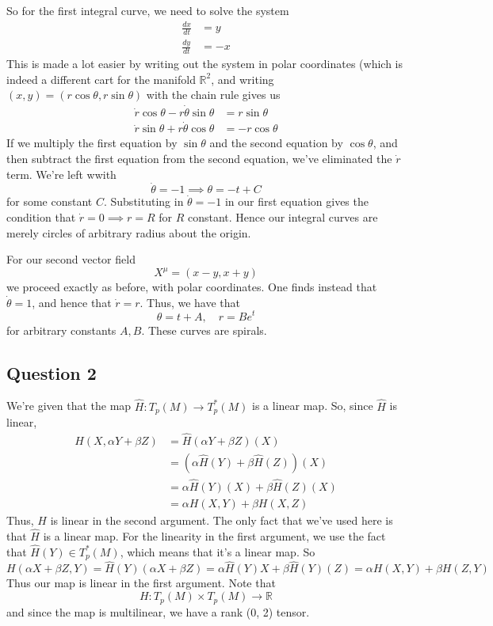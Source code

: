 \documentclass[11pt, a4paper]{article}   	%
\theoremstyle{slplain}
\begin{document}
So for the first integral curve, we need to solve the system 
\begin{align*} 
\frac{dx}{dt}  &= y \\
\frac{dy}{dt}  &= -x 
\end{align*} 
This is made a lot easier by writing out the system in polar coordinates (which is indeed a different cart for the manifold $\mathbb{R}^2$, and writing $(x , y)  = ( r \cos \theta, r \sin \theta)$ with the chain rule gives us 
\begin{align*} 
\dot{r} \cos \theta  - r \dot{\theta} \sin \theta  &= r \sin \theta \\
\dot{r} \sin \theta  + r \dot{\theta} \cos \theta &=  - r \cos \theta 
\end{align*} 
If we multiply the first equation by $\sin \theta$ and the second equation by $\cos \theta$, and then subtract the first equation from the second equation, we've eliminated the $\dot{ r}$ term. We're left wwith 
\[ 
\dot{\theta} =  -1 \implies \theta  =  - t + C
\] 
for some constant $C$. Substituting in $\dot{\theta} = - 1$ in our first equation gives the condition that $\dot{r} = 0 \implies r = R$ for $R$ constant. Hence our integral curves are merely circles of arbitrary radius about the origin. 

For our second vector field 
\[ 
X^\mu  = ( x - y, x +y ) 
\] 
we proceed exactly as before, with polar coordinates. One finds instead that $\dot{\theta} = 1$, and hence that $\dot{r}  = r$. Thus, we have that 
\[
\theta = t + A, \quad r = Be^t 
\] 
for arbitrary constants $A, B$. These curves are spirals. 

\pagebreak
\subsection{Question 2} 
We're given that the map $\hat{ H }  : T_p (M) \rightarrow T_p^* ( M ) $ is a linear map. So, since $\hat{ H } $ is linear, 
\begin{align*} 
H ( X, \alpha Y + \beta Z ) & = \hat{H} ( \alpha Y + \beta Z) ( X) \\ &= ( \alpha \hat{ H} ( Y ) + \beta \hat{H} ( Z) ) ( X) \\
&= \alpha \hat{H}( Y) ( X) + \beta \hat{H} (Z) ( X) \\
&= \alpha H ( X, Y ) + \beta H ( X, Z) 
\end{align*} 
Thus, $H$ is linear in the second argument. The only fact that we've used here is that $\hat{H}$ is a linear map. For the linearity in the first argument, we use the fact that $\hat{H} (Y) \in T_p^* (M)$, which means that it's a linear map. So 
\[ 
H ( \alpha X + \beta Z, Y ) = \hat{H}( Y) ( \alpha X + \beta Z)  = \alpha \hat{H} (Y) X + \beta \hat{H} (Y) ( Z)  = \alpha H(X, Y ) + \beta H(Z, Y ) 
\] Thus our map is linear in the first argument. Note that
\[ 
H : T_p ( M) \times T_p ( M) \rightarrow \mathbb{R} 
\] and since the map is multilinear, we have a rank (0, 2) tensor.
\end{document}
